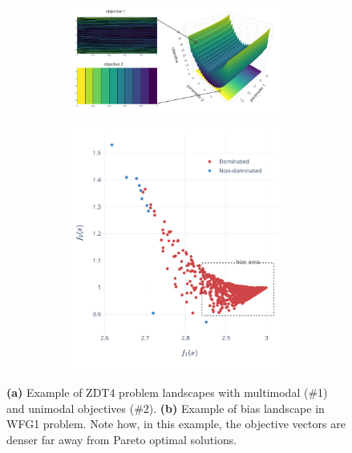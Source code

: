     \begin{figure}
        \centering
        \begin{subfigure}{\textwidth}
            \begin{subfigure}{0.64\textwidth}
                \includegraphics[width=\textwidth]{content/images/utility/multi_modal_zdt4}
                \caption{}
                \label{fig:multi_modal_zdt4}
            \end{subfigure} 
            \begin{subfigure}{0.35\textwidth}
                \includegraphics[width=\textwidth]{content/images/utility/bias_area_wfg1}
                \caption{}
                \label{fig:bias_area_wfg1}
            \end{subfigure} 
        \end{subfigure} 
        \caption[Example of unimodal, multimodal and bias problems]{\textbf{(a)} Example of ZDT4 problem landscapes with multimodal (\#1) and unimodal objectives (\#2). \textbf{(b)} Example of bias landscape in WFG1 problem. Note how, in this example, the objective vectors are denser far away from Pareto optimal solutions.}
        \label{fig:changing_models}    
    \end{figure}

